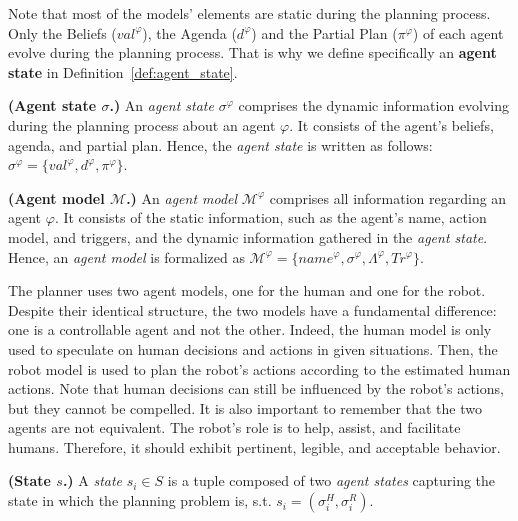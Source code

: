 Note that most of the models' elements are static during the planning process. Only the Beliefs ($val^{\varphi}$), the Agenda ($d^{\varphi}$) and the Partial Plan ($\pi^{\varphi}$) of each agent evolve during the planning process. 
That is why we define specifically an \textbf{agent state} in Definition~\ref{def:agent_state}.

\begin{definition}
    \textbf{(Agent state $\sigma$.)} An \emph{agent state} $\sigma^{\varphi}$ comprises the dynamic information evolving during the planning process about an agent $\varphi$. It consists of the agent's beliefs, agenda, and partial plan. Hence, the \emph{agent state} is written as follows: $\sigma^{\varphi} = \{ val^{\varphi}, d^{\varphi}, \pi^{\varphi} \}$.
    \label{def:agent_state}
\end{definition}

\begin{definition}
    \textbf{(Agent model $\mathcal{M}$.)} An \emph{agent model} $\mathcal{M}^{\varphi}$ comprises all information regarding an agent $\varphi$. It consists of the static information, such as the agent's name, action model, and triggers, and the dynamic information gathered in the \emph{agent state}. Hence,  an \emph{agent model} is formalized as $\mathcal{M}^{\varphi} = \{ name^{\varphi}, \sigma^{\varphi}, \Lambda^{\varphi}, Tr^{\varphi} \}$.
    \label{def:agent_model}
\end{definition}

The planner uses two agent models, one for the human and one for the robot. Despite their identical structure, the two models have a fundamental difference: one is a controllable agent and not the other. Indeed, the human model is only used to speculate on human decisions and actions in given situations. 
Then, the robot model is used to plan the robot's actions according to the estimated human actions.
Note that human decisions can still be influenced by the robot's actions, but they cannot be compelled.
It is also important to remember that the two agents are not equivalent. The robot's role is to help, assist, and facilitate humans. Therefore, it should exhibit pertinent, legible, and acceptable behavior.

\begin{definition}
    \textbf{(State $s$.)} A \emph{state} $s_i \in S$ is a tuple composed of two \emph{agent states} capturing the state in which the planning problem is, s.t. $s_i = ( \sigma^{H}_i, \sigma^{R}_i )$.
    \label{def:state}
\end{definition}
 

